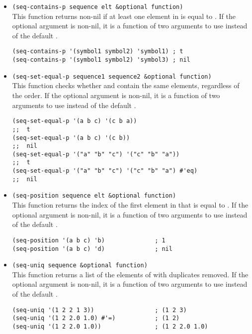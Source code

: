 \begin{itemize}
  
\item \lstinline|(seq-contains-p sequence elt &optional function)|\\
  This function returns non-nil if at least one element in  is equal to .
  If the optional argument  is non-nil, it is a function of two arguments to use instead of the default .
\begin{lstlisting}
(seq-contains-p '(symbol1 symbol2) 'symbol1) ; t
(seq-contains-p '(symbol1 symbol2) 'symbol3) ; nil
\end{lstlisting}

\item \lstinline|(seq-set-equal-p sequence1 sequence2 &optional function)|\\
  This function checks whether  and  contain the same elements, regardless of the order.
  If the optional argument  is non-nil, it is a function of two arguments to use instead of the default .
\begin{lstlisting}
(seq-set-equal-p '(a b c) '(c b a))
;;  t
(seq-set-equal-p '(a b c) '(c b))
;;  nil
(seq-set-equal-p '("a" "b" "c") '("c" "b" "a"))
;;  t
(seq-set-equal-p '("a" "b" "c") '("c" "b" "a") #'eq)
;;  nil
\end{lstlisting}
  
\item \lstinline|(seq-position sequence elt &optional function)|\\
  This function returns the index of the first element in  that is equal to .
  If the optional argument  is non-nil, it is a function of two arguments to use instead of the default .
\begin{lstlisting}
(seq-position '(a b c) 'b)              ; 1
(seq-position '(a b c) 'd)              ; nil
\end{lstlisting}

  
\item \lstinline|(seq-uniq sequence &optional function)|\\
  This function returns a list of the elements of  with duplicates removed.
  If the optional argument  is non-nil, it is a function of two arguments to use instead of the default .
\begin{lstlisting}
(seq-uniq '(1 2 2 1 3))                 ; (1 2 3)
(seq-uniq '(1 2 2.0 1.0) #'=)           ; (1 2)
(seq-uniq '(1 2 2.0 1.0))               ; (1 2 2.0 1.0)
\end{lstlisting}


\end{itemize}
